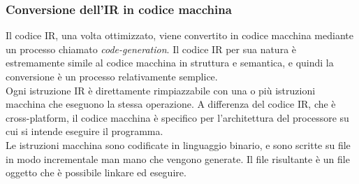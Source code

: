 \subsubsection{Conversione dell'IR in codice macchina}
Il codice IR, una volta ottimizzato, viene convertito in codice macchina mediante un processo chiamato 
\textit{code-generation}. Il codice IR per sua natura è estremamente simile al codice macchina in struttura e 
semantica, e quindi la conversione è un processo relativamente semplice. \\

Ogni istruzione IR è direttamente rimpiazzabile con una o più istruzioni macchina che eseguono la stessa operazione. A 
differenza del codice IR, che è cross-platform, il codice macchina è specifico per l'architettura del processore su cui
si intende eseguire il programma. \\

Le istruzioni macchina sono codificate in linguaggio binario, e sono scritte su file in modo incrementale man mano 
che vengono generate. Il file risultante è un file oggetto che è possibile linkare ed eseguire. \\